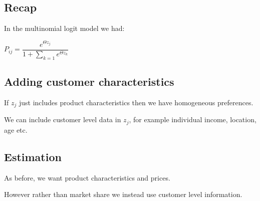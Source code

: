 
\subsection{Recap}

In the multinomial logit model we had:

\(P_{ij}=\dfrac{e^{\Theta z_j}}{1+\sum_{k=1} e^{\Theta z_k }}\)

\subsection{Adding customer characteristics}

If \(z_j\) just includes product characteristics then we have homogeneous preferences.

We can include customer level data in \(z_j\), for example individual income, location, age etc.

\subsection{Estimation}

As before, we want product characteristics and prices.

However rather than market share we instead use customer level  information.

